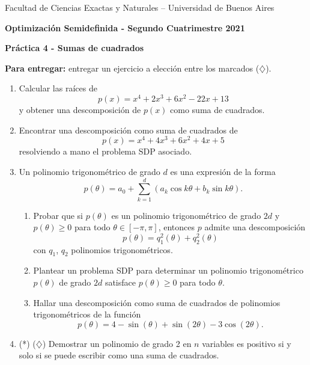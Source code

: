 \documentclass[11pt]{article}
\begin{document}
\begin{center}

{\small Facultad de Ciencias Exactas
y Naturales -- Universidad de Buenos Aires } \vskip 1cm

\textbf{{\large Optimización Semidefinida} - Segundo Cuatrimestre 2021}

\medskip\textbf{Pr\'actica 4 - Sumas de cuadrados}
\end{center}

\medskip

\textbf{Para entregar:} entregar un ejercicio a elección entre los marcados ($\diamondsuit$).

\vspace{0.5cm}

\begin{enumerate}

\item Calcular las raíces de
$$
p(x) = x^4 + 2x^3 + 6x^2 - 22x + 13
$$
y obtener una descomposición de $p(x)$ como suma de cuadrados.

\item Encontrar una descomposición como suma de cuadrados de
$$
p(x) = x^4 + 4x^3 + 6x^2 + 4x + 5
$$
resolviendo a mano el problema SDP asociado.

\item Un polinomio trigonométrico de grado $d$ es una expresión de la forma
$$
p(\theta) = a_0 + \sum_{k=1}^d (a_k \cos{k \theta} + b_k \sin{k \theta}).
$$
\begin{enumerate}
\item Probar que si $p(\theta)$ es un polinomio trigonométrico de grado $2d$ y $p(\theta) \ge 0$ para todo $\theta \in [-\pi, \pi]$, entonces $p$ admite una descomposición
    $$
    p(\theta) = q_1^2(\theta) + q_2^2(\theta)
    $$
con $q_1$, $q_2$ polinomios trigonométricos.

\item Plantear un problema SDP para determinar un polinomio trigonométrico $p(\theta)$ de grado $2d$ satisface $p(\theta) \ge 0$ para todo $\theta$.

\item Hallar una descomposición como suma de cuadrados de polinomios trigonométricos de la función
$$
p(\theta) = 4 - \sin(\theta) + \sin(2\theta) - 3 \cos(2\theta).
$$

\end{enumerate}

\item (*) ($\diamondsuit$) Demostrar un polinomio de grado 2 en $n$ variables es positivo si y solo si se puede escribir como una suma de cuadrados.


\end{enumerate}
\end{document}
